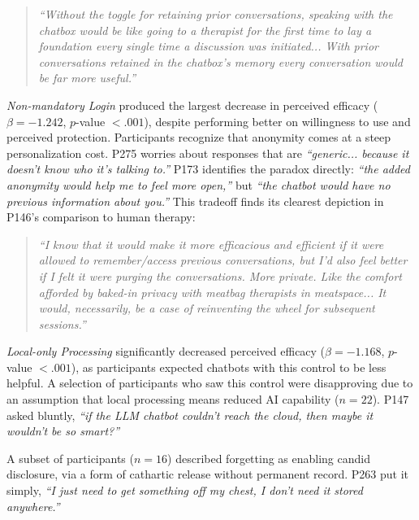 \documentclass[letterpaper,twocolumn,10pt]{article}
\begin{document}
\begin{quote}
\textit{``Without the toggle for retaining prior conversations, speaking with the chatbox would be like going to a therapist for the first time to lay a foundation every single time a discussion was initiated... With prior conversations retained in the chatbox's memory every conversation would be far more useful.''}
\end{quote}

 \emph{Non-mandatory Login} produced the largest decrease in perceived efficacy ($\beta = -1.242$, $p$-value $< .001$), despite performing better on willingness to use and perceived protection. Participants recognize that anonymity comes at a steep personalization cost. P275 worries about responses that are \textit{``generic... because it doesn't know who it's talking to.''} P173 identifies the paradox directly: \textit{``the added anonymity would help me to feel more open,''} but \textit{``the chatbot would have no previous information about you.''} This tradeoff finds its clearest depiction in P146's comparison to human therapy:

\begin{quote}
\textit{``I know that it would make it more efficacious and efficient if it were allowed to remember/access previous conversations, but I'd also feel better if I felt it were purging the conversations. More private. Like the comfort afforded by baked-in privacy with meatbag therapists in meatspace... It would, necessarily, be a case of reinventing the wheel for subsequent sessions.''}
\end{quote}

 \emph{Local-only Processing} significantly decreased perceived efficacy ($\beta = -1.168$, $p$-value $< .001$), as participants expected chatbots with this control to be less helpful. A selection of participants who saw this control were disapproving due to an assumption that local processing means reduced AI capability ($n=22$). P147 asked bluntly, \textit{``if the LLM chatbot couldn't reach the cloud, then maybe it wouldn't be so smart?''} 

 A subset of participants ($n=16$) described forgetting as enabling candid disclosure, via a form of cathartic release without permanent record. P263 put it simply, \textit{``I just need to get something off my chest, I don't need it stored anywhere.''} 
\end{document}
